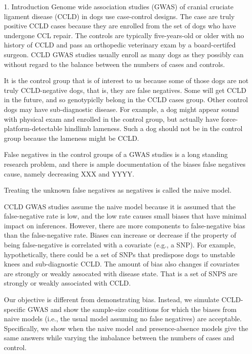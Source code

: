 
1. Introduction
Genome wide association studies (GWAS) of cranial cruciate ligament disease (CCLD) in dogs use case-control designs. The case are truly positive CCLD cases because they are enrolled from the set of dogs who have undergone CCL repair. The controls are typically five-years-old or older with no history of CCLD and pass an orthopedic veterinary exam by a board-certifed surgeon. CCLD GWAS studies usually enroll as many dogs as they possibly can without regard to the balance between the numbers of cases and controls.

It is the control group that is of interest to us because some of those dogs are not truly CCLD-negative dogs, that is, they are false negatives. Some will get CCLD in the future, and so genotypiclly belong in the CCLD cases group. Other control dogs may have sub-diagnostic disease. For example, a dog might appear sound with physical exam and enrolled in the control group, but actually have force-platform-detectable hindlimb lameness. Such a dog should not be in the control group because the lameness might be CCLD. 

False negatives in the control groups of a GWAS studies is a long standing research problem, and there is ample documentation of the biases false negatives cause, namely decreasing XXX and YYYY. 

Treating the unknown false negatives as negatives is called the naive model. 

CCLD GWAS studies assume the naive model because it is assumed that the false-negative rate is low, and the low rate causes small biases that have minimal impact on inferences. However, there are more components to false-negative bias than the false-negative rate. Biases can increase or decrease if the property of being false-negative is correlated with a covariate (e.g., a SNP). For example, hypothetically, there could be a set of SNPs that predispose dogs to unstable knees and sub-diagnostic CCLD. The amount of bias also changes if covariates are strongly or weakly assocated with disease state. That is a set of SNPS are strongly or weakly associated with CCLD. 

Our objective is different from demonstrating bias. Instead, we simulate CCLD-specific GWAS and show the sample-size conditions for which the biases from naive models (i.e., the usual model assuming no false negatives) are acceptable. Specifically, we show when the naive model and presence-absence models give the same answers while varying the imbalance between the numbers of cases and control.   

